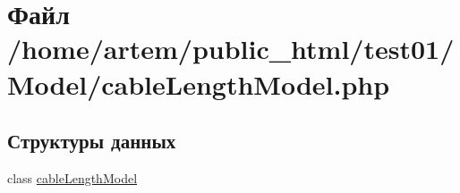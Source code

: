 \hypertarget{cable_length_model_8php}{\section{Файл /home/artem/public\-\_\-html/test01/\-Model/cable\-Length\-Model.php}
\label{cable_length_model_8php}
}
\subsection*{Структуры данных}
\begin{DoxyCompactItemize}
\item 
class \hyperlink{classcable_length_model}{cable\-Length\-Model}
\end{DoxyCompactItemize}
